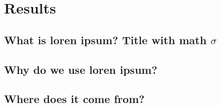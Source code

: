 
\chapter{Results}  %

\ifpdf
    \graphicspath{{Chapter5/Figs/Raster/}{Chapter5/Figs/PDF/}{Chapter5/Figs/}}
\else
    \graphicspath{{Chapter5/Figs/Vector/}{Chapter5/Figs/}}
\fi


\section{What is loren ipsum? Title with math \texorpdfstring{$\sigma$}{[sigma]}} %



\section{Why do we use loren ipsum?} %


\section{Where does it come from?}  %
\label{section5.3}

